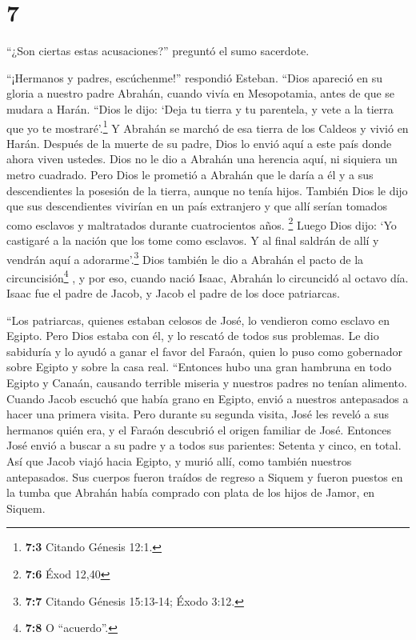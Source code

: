 \hypertarget{section-6}{%
\section{7}\label{section-6}}

 ``¿Son ciertas estas acusaciones?'' preguntó el sumo
sacerdote.

 ``¡Hermanos y padres, escúchenme!'' respondió Esteban.
``Dios apareció en su gloria a nuestro padre Abrahán, cuando vivía en
Mesopotamia, antes de que se mudara a Harán.  ``Dios le
dijo: `Deja tu tierra y tu parentela, y vete a la tierra que yo te
mostraré'.\footnote{\textbf{7:3} Citando Génesis 12:1.}  Y
Abrahán se marchó de esa tierra de los Caldeos y vivió en Harán. Después
de la muerte de su padre, Dios lo envió aquí a este país donde ahora
viven ustedes.  Dios no le dio a Abrahán una herencia
aquí, ni siquiera un metro cuadrado. Pero Dios le prometió a Abrahán que
le daría a él y a sus descendientes la posesión de la tierra, aunque no
tenía hijos.  También Dios le dijo que sus descendientes
vivirían en un país extranjero y que allí serían tomados como esclavos y
maltratados durante cuatrocientos años. \footnote{\textbf{7:6} Éxod
  12,40}  Luego Dios dijo: `Yo castigaré a la nación que
los tome como esclavos. Y al final saldrán de allí y vendrán aquí a
adorarme'.\footnote{\textbf{7:7} Citando Génesis 15:13-14; Éxodo 3:12.}
 Dios también le dio a Abrahán el pacto de la
circuncisión\footnote{\textbf{7:8} O ``acuerdo''.} , y por eso, cuando
nació Isaac, Abrahán lo circuncidó al octavo día. Isaac fue el padre de
Jacob, y Jacob el padre de los doce patriarcas.

 ``Los patriarcas, quienes estaban celosos de José, lo
vendieron como esclavo en Egipto. Pero Dios estaba con él,
 y lo rescató de todos sus problemas. Le dio sabiduría y
lo ayudó a ganar el favor del Faraón, quien lo puso como gobernador
sobre Egipto y sobre la casa real.  ``Entonces hubo una
gran hambruna en todo Egipto y Canaán, causando terrible miseria y
nuestros padres no tenían alimento.  Cuando Jacob escuchó
que había grano en Egipto, envió a nuestros antepasados a hacer una
primera visita.  Pero durante su segunda visita, José les
reveló a sus hermanos quién era, y el Faraón descubrió el origen
familiar de José.  Entonces José envió a buscar a su
padre y a todos sus parientes: Setenta y cinco, en total.
 Así que Jacob viajó hacia Egipto, y murió allí, como
también nuestros antepasados.  Sus cuerpos fueron traídos
de regreso a Siquem y fueron puestos en la tumba que Abrahán había
comprado con plata de los hijos de Jamor, en Siquem.

